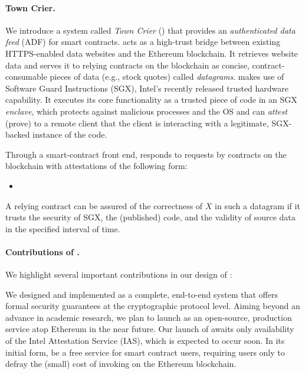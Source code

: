 \paragraph{\bf Town Crier.} We introduce a system called \emph{Town Crier} (\tc) that provides an \emph{authenticated data feed} (ADF) for smart contracts. \tc acts as a high-trust bridge between existing HTTPS-enabled data websites and the Ethereum blockchain. It retrieves website data and serves it to relying contracts on the blockchain as concise, contract-consumable pieces of data (e.g., stock quotes) called \emph{datagrams}. \tc makes use of Software Guard Instructions (SGX),  Intel's recently released trusted hardware capability. It executes its core functionality as a trusted piece of code in an SGX \emph{enclave}, which protects against malicious processes and the OS and can \emph{attest} (prove) to a remote client that the client is interacting with a legitimate, SGX-backed instance of the \tc code. 

Through a smart-contract front end, \tcs responds to requests by contracts on the blockchain with attestations of the following form:

\begin{itemize}[leftmargin=3mm]
\item[]
\end{itemize}

A relying contract can be assured of the correctness of $X$ in such a datagram if it trusts the security of SGX, the (published) \tc code, and the validity of source data in the specified interval of time.

\paragraph{Contributions of \tc.}
We highlight several important contributions in our design of \tc:

\vspace{1ex}
We designed and implemented \tcs as a complete, end-to-end system that offers formal security guarantees
at the cryptographic protocol level. Aiming beyond an advance in academic research, we plan to launch \tcs
as an open-source, production service atop Ethereum in the near future. Our launch of \tc awaits only availability of the Intel Attestation Service (IAS), which is expected to occur soon. In its initial form, \tcs be a free service for smart contract users, requiring users only to defray the (small) cost of invoking \tc on the Ethereum blockchain. 

